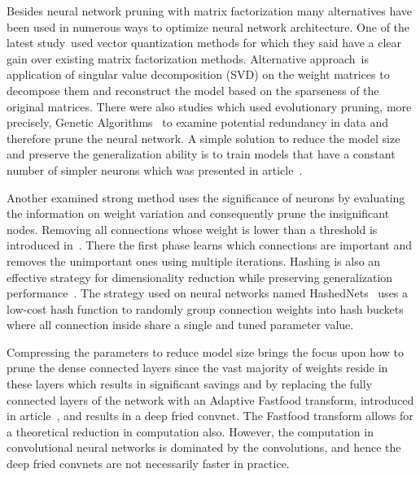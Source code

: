 \documentclass{article} %
\begin{document}
Besides neural network pruning with matrix factorization many alternatives have
been used in numerous ways to optimize neural network architecture. One of the
latest study~\cite{DBLP:journals/corr/GongLYB14}used vector quantization
methods for which they said have a clear gain over existing matrix
factorization methods. Alternative approach~\cite{xue2013restructuring}is
application of singular value decomposition (SVD) on the weight matrices to
decompose them and reconstruct the model based on the sparseness of the
original matrices. There were also studies which used evolutionary pruning,
more precisely, Genetic Algorithms~\cite{li2012tuning} to examine potential
redundancy in data and therefore prune the neural network. A simple solution to
reduce the model size and preserve the generalization ability is to train
models that have a constant number of simpler neurons which was presented in
article~\cite{collins2014memory}.

Another examined strong method uses the significance of neurons by evaluating
the information on weight variation and consequently prune the insignificant
nodes. Removing all connections whose weight is lower than a threshold is
introduced in~\cite{han2015learning}. There the first phase learns which
connections are important and removes the unimportant ones using multiple
iterations. Hashing is also an effective strategy for dimensionality reduction
while preserving generalization performance~\cite{weinberger2009feature,
shi2009hash}. The strategy used on neural networks named
HashedNets~\cite{chen2015compressing} uses a low-cost hash function to randomly
group connection weights into hash buckets where all connection inside share a
single and tuned parameter value.

Compressing the parameters to reduce model size brings the focus upon how to
prune the dense connected layers since the vast majority of weights reside in
these layers which results in significant savings and by replacing the fully
connected layers of the network with an Adaptive Fastfood transform, introduced
in article~\cite{yang2014deep}, and results in a deep fried convnet. The
Fastfood transform allows for a theoretical reduction in computation also.
However, the computation in convolutional neural networks is dominated by the
convolutions, and hence the deep fried convnets are not necessarily faster in
practice.

\end{document}
